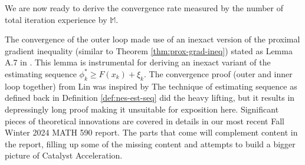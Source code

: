 \documentclass[12pt]{article}
\begin{document}
            We are now ready to derive the convergence rate measured by the number of total iteration experience by $\mathbb M$. 
            \par 
            The convergence of the outer loop made use of an inexact version of the proximal gradient inequality (similar to Theorem \ref{thm:prox-grad-ineq}) stated as Lemma A.7 in \cite{lin_universal_2015}. 
            This lemma is instrumental for deriving an inexact variant of the estimating sequence $\phi_k^* \ge F(x_k) + \xi_k$. 
            The convergence proof (outer and inner loop together) from Lin was inspired by 
            The technique of estimating sequence as defined back in Definition \ref{def:nes-est-seq} did the heavy lifting, but it results in depressingly long proof making it unsuitable for exposition here. 
            Significant pieces of theoretical innovations are covered in details in our most recent Fall Winter 2024 MATH 590 report. 
            The parts that come will complement content in the report, filling up some of the missing content and attempts to build a bigger picture of Catalyst Acceleration. 
\end{document}
